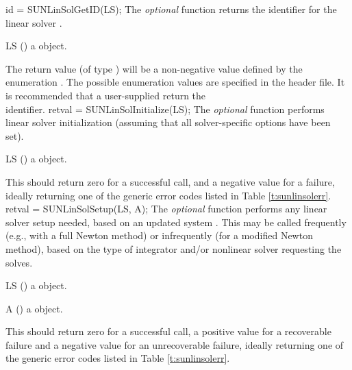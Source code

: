 {
  id = SUNLinSolGetID(LS);
}
{
  The \textit{optional} function  returns the
  identifier for the linear solver .
}
{
  \begin{args}[LS]
  \item[LS] ()
    a {\sunlinsol} object.
  \end{args}
}
{
  The return value  (of type ) will be a non-negative value
  defined by the enumeration .  The possible enumeration
  values are specified in the  header file.
}
{
  It is recommended that a user-supplied  return the\\
  \noindent {} identifier.
}
{
  retval = SUNLinSolInitialize(LS);
}
{
  The \textit{optional} function  performs
  linear solver initialization (assuming that all solver-specific
  options have been set).
}
{
  \begin{args}[LS]
  \item[LS] ()
    a {\sunlinsol} object.
  \end{args}
}
{
  This should return zero for a
  successful call, and a negative value for a failure, ideally
  returning one of the generic error codes listed in Table
  \ref{t:sunlinsolerr}.
}
{}
{
  retval = SUNLinSolSetup(LS, A);
}
{
  The \textit{optional} function  performs
  any linear solver setup needed, based on an updated system
  {\sunmatrix} .  This may be called frequently (e.g., with a full
  Newton method) or infrequently (for a modified Newton method), based
  on the type of integrator and/or nonlinear solver requesting the
  solves.
}
{
  \begin{args}[LS]
  \item[LS] ()
    a {\sunlinsol} object.
  \item[A] ()
    a {\sunmatrix} object.
  \end{args}
}
{
  This should return zero for a successful call, a positive
  value for a recoverable failure and a negative value for an
  unrecoverable failure, ideally returning one of the generic error
  codes listed in Table \ref{t:sunlinsolerr}.
}
